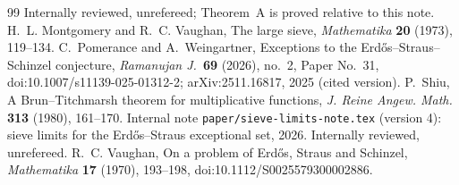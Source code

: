 \documentclass[10pt,reqno]{amsart}
\theoremstyle{remark}
\begin{document}
\begin{thebibliography}{99}
Internally reviewed, unrefereed; Theorem~A is proved relative to this note.
H.~L. Montgomery and R.~C. Vaughan, The large sieve, \emph{Mathematika}
\textbf{20} (1973), 119--134.
C.~Pomerance and A.~Weingartner, Exceptions to the
Erd\H{o}s--Straus--Schinzel conjecture, \emph{Ramanujan J.}\ \textbf{69} (2026), no.~2, Paper No.~31,
doi:10.1007/s11139-025-01312-2; arXiv:2511.16817, 2025
(cited version).
P.~Shiu, A Brun--Titchmarsh theorem for multiplicative functions,
\emph{J. Reine Angew. Math.} \textbf{313} (1980), 161--170.
Internal note \texttt{paper/sieve-limits-note.tex} (version 4): sieve
limits for the Erd\H{o}s--Straus exceptional set, 2026.  Internally
reviewed, unrefereed.
R.~C. Vaughan, On a problem of Erd\H{o}s, Straus and Schinzel,
\emph{Mathematika} \textbf{17} (1970), 193--198,
doi:10.1112/S0025579300002886.
\end{thebibliography}
\end{document}
